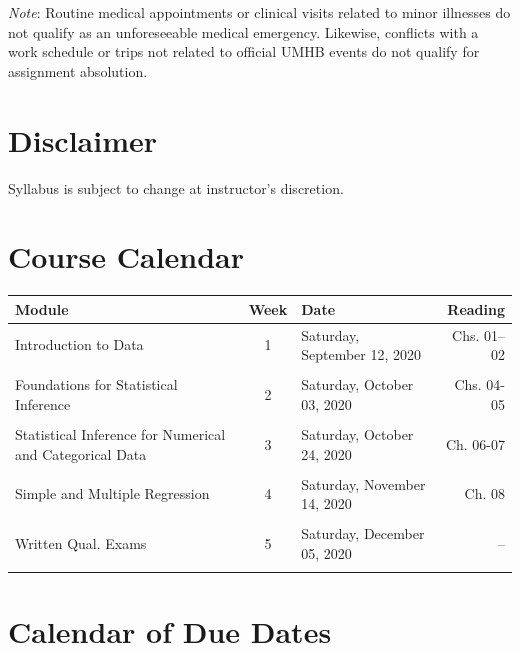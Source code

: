 \documentclass[
]{article}
\begin{document}
\emph{Note}: Routine medical appointments or clinical visits related to
minor illnesses do not qualify as an unforeseeable medical emergency.
Likewise, conflicts with a work schedule or trips not related to
official UMHB events do not qualify for assignment absolution.

\section{Disclaimer}

Syllabus is subject to change at instructor's discretion.

\newpage

\section{Course Calendar}

\begin{tabularx}{\linewidth}{XcXr}
\hline
\textbf{Module} & \textbf{Week} & \textbf{Date} & \textbf{Reading} \\
\hline

Introduction to Data & 1 & Saturday, September 12, 2020 & Chs. 01--02 \\
 &  &  &  \\
 
Foundations for Statistical Inference & 2 & Saturday, October 03, 2020 & Chs. 04-05 \\
 &  &  & \\
 
Statistical Inference for Numerical and Categorical Data & 3 & Saturday, October 24, 2020 & Ch. 06-07 \\
 &  &  & \\
 
Simple and Multiple Regression & 4 & Saturday, November 14, 2020 & Ch. 08 \\
 &  &  &  \\
 
Written Qual. Exams & 5 & Saturday, December 05, 2020 & -- \\
 &  &  &  \\
\hline
\end{tabularx}

\newpage
\section{Calendar of Due Dates}
\end{document}
